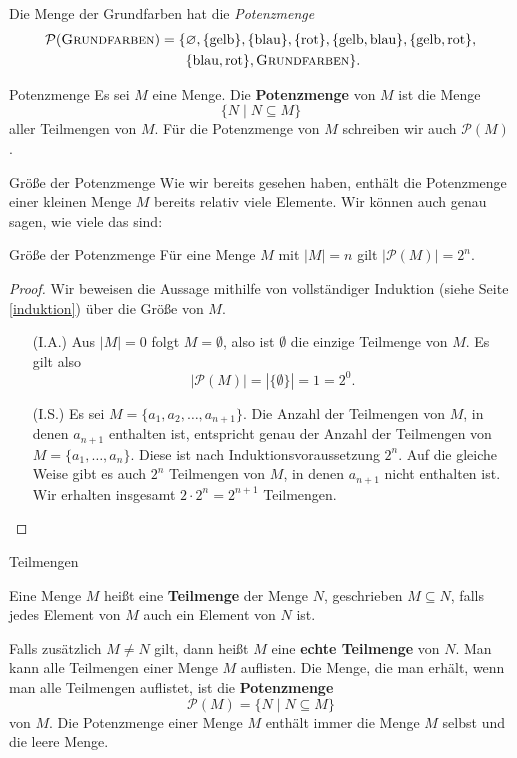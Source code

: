 \documentclass[../../main.tex]{subfiles}
\begin{document}
\begin{example}{}
    Die Menge der Grundfarben hat die \emph{Potenzmenge}
    \begin{align*}
        \mathcal{P}(\textsc{Grundfarben})=\{&\emptyset,\{\text{gelb}\},\{\text{blau}\},\{\text{rot}\},\{\text{gelb},\text{blau}\},\{\text{gelb},\text{rot}\},\\
        &\{\text{blau},\text{rot}\},\textsc{Grundfarben}\}.
    \end{align*}
\end{example}

\begin{definition}{Potenzmenge}
    Es sei $M$ eine Menge. Die \textbf{Potenzmenge} von $M$ ist die Menge 
    \[\{N\mid N\subseteq M\}\]
    aller Teilmengen von $M$. Für die Potenzmenge von $M$ schreiben wir auch $\mathcal{P}(M)$.
\end{definition}

\begin{advanced}{Größe der Potenzmenge}
    Wie wir bereits gesehen haben, enthält die Potenzmenge einer kleinen Menge $M$ bereits relativ viele Elemente. Wir können auch genau sagen, wie viele das sind:
    \begin{theorem}{Größe der Potenzmenge}
        Für eine Menge $M$ mit $|M|=n$ gilt $|\mathcal{P}(M)|=2^n$.
    \end{theorem}
    \begin{proof}
        Wir beweisen die Aussage mithilfe von vollständiger Induktion (siehe Seite \ref{induktion}) über die Größe von $M$.
        \begin{enumerate}
            \item[(I.A.)] Aus $|M|=0$ folgt $M=\emptyset$, also ist $\emptyset$ die einzige Teilmenge von $M$. Es gilt also
                \[|\mathcal{P}(M)|=|\{\emptyset\}|=1=2^0.\]
            \item[(I.S.)] Es sei $M=\{a_1,a_2,\dots,a_{n+1}\}$. Die Anzahl der Teilmengen von $M$, in denen $a_{n+1}$ enthalten ist, entspricht genau der Anzahl der Teilmengen von $M=\{a_1,\dots,a_n\}$. Diese ist nach Induktionsvoraussetzung $2^n$. Auf die gleiche Weise gibt es auch $2^n$ Teilmengen von $M$, in denen $a_{n+1}$ nicht enthalten ist. Wir erhalten insgesamt $2\cdot 2^n=2^{n+1}$ Teilmengen.
        \end{enumerate}
    \end{proof}
\end{advanced}

\begin{nutshell}{Teilmengen}

    Eine Menge $M$ heißt eine \textbf{Teilmenge} der Menge $N$, geschrieben $M\subseteq N$, falls jedes Element von $M$ auch ein Element von $N$ ist.

    Falls zusätzlich $M\neq N$ gilt, dann heißt $M$ eine \textbf{echte Teilmenge} von $N$. Man kann alle Teilmengen einer Menge $M$ auflisten. Die Menge, die man erhält, wenn man alle Teilmengen auflistet, ist die \textbf{Potenzmenge}
    \[\mathcal{P}(M)=\{N\mid N\subseteq M\}\]
    von $M$. Die Potenzmenge einer Menge $M$ enthält immer die Menge $M$ selbst und die leere Menge.
\end{nutshell}
\end{document}
